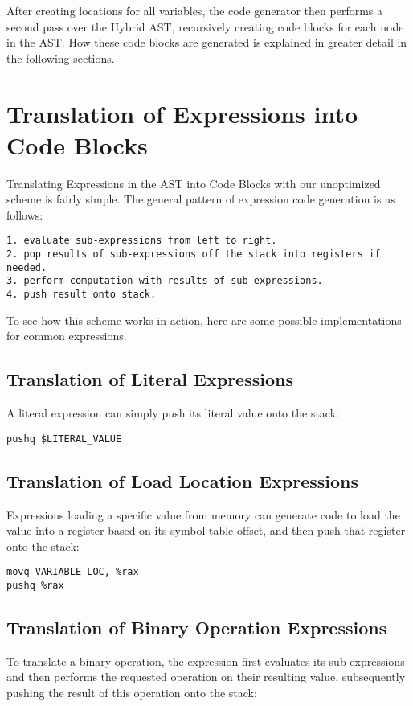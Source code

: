 \documentclass[11pt]{article}
\begin{document}
After creating locations for all variables, the code generator then performs a second pass over the Hybrid AST, recursively creating code blocks for each node in the AST. How these code blocks are generated is explained in greater detail in the following sections. 

\section {Translation of Expressions into Code Blocks}
\label{sec:expr}

Translating Expressions in the AST into Code Blocks with our unoptimized scheme is fairly simple. The general pattern of expression code generation is as follows: 

\begin{verbatim}
1. evaluate sub-expressions from left to right.
2. pop results of sub-expressions off the stack into registers if needed.
3. perform computation with results of sub-expressions.
4. push result onto stack. 
\end{verbatim}

\noindent To see how this scheme works in action, here are some possible implementations for common expressions. 

\subsection{Translation of Literal Expressions} 

A literal expression can simply push its literal value onto the stack: 

\begin{verbatim} 
pushq $LITERAL_VALUE 
\end{verbatim}

\subsection{Translation of Load Location Expressions} 

Expressions loading a specific value from memory can generate code to load the value into a register based on its symbol table offset, and then push that register onto the stack: 

\begin{verbatim}
movq VARIABLE_LOC, %rax
pushq %rax
\end{verbatim}

\subsection{Translation of Binary Operation Expressions} 
To translate a binary operation, the expression first evaluates its sub expressions and then performs the requested operation on their resulting value, subsequently pushing the result of this operation onto the stack: 
\end{document}
